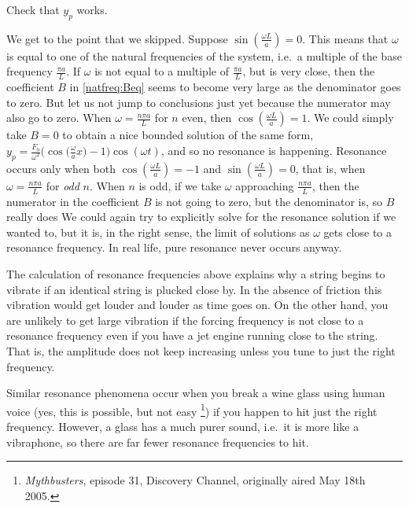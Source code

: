 \begin{exercise}
Check that $y_p$ works.
\end{exercise}

We get to the point that we skipped.  Suppose 
$\sin ( \frac{\omega L}{a} ) = 0$.  This means that
$\omega$ is equal to one of the natural frequencies of the system,
i.e.\ a multiple of the base frequency $\frac{\pi a}{L}$.
If $\omega$
is not equal to a multiple of $\frac{\pi a}{L}$,
but is very close,
then the coefficient $B$ in \eqref{natfreq:Beq} seems to
become very large as the denominator goes to zero.
But let us not jump to conclusions just yet
because the numerator may also go to zero.
When $\omega = \frac{n \pi a}{L}$
for $n$ even, then $\cos (\frac{\omega L}{a}) = 1$.
We could simply
take $B=0$ to obtain a nice bounded solution of the same form,
$y_p = 
\frac{F_0}{\omega^2}
\bigl(
 \cos\bigl(\frac{\omega}{a} x\bigr) -  1 \bigr)
\cos(\omega t)$, and so no resonance is happening.
Resonance occurs only when 
both $\cos (\frac{\omega L}{a}) = -1$ and
$\sin (\frac{\omega L}{a}) = 0$,
that is, when $\omega = \frac{n \pi a }{L}$
for \emph{odd} $n$.
When $n$ is odd, if we take $\omega$ approaching
$\frac{n \pi a }{L}$, then the numerator in the coefficient
$B$ is not going to zero, but the denominator is, so $B$ really does
We could again try to explicitly solve for the resonance solution if we wanted to, but it is, in the right sense, the limit of solutions as $\omega$ gets
close to a resonance frequency.
In real life, pure resonance never occurs anyway.

The calculation of resonance frequencies above explains why a string begins
to vibrate if an
identical string is plucked close by.  In the absence of friction this vibration
would get louder and louder as time goes on.
On the other hand, you are unlikely to get large vibration if the forcing 
frequency is not close to a resonance frequency even if you have a jet engine
running close to
the string.  That is, the amplitude does not keep
increasing unless you tune to just the right frequency.

Similar resonance phenomena occur when you break a wine glass using human
voice (yes,
this is possible, but not easy%
\footnote{\emph{Mythbusters}, episode 31, Discovery Channel, originally aired
May 18th 2005.}) if you happen to hit just the right
frequency.  However, a glass has a much purer sound, i.e.\ it is more like a
vibraphone, so there are far fewer resonance frequencies to hit.

